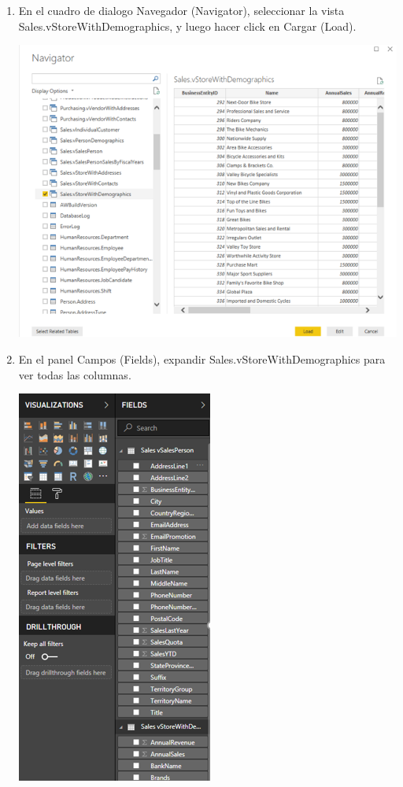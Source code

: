 \begin{itemize}
\begin{enumerate}
\item En el cuadro de dialogo Navegador (Navigator), seleccionar la vista Sales.vStoreWithDemographics, y luego hacer click en Cargar (Load).

\begin{center}
\includegraphics[scale=0.55]{./Imagenes/a9.png}
\end{center}

\item En el panel Campos (Fields), expandir Sales.vStoreWithDemographics para ver todas las columnas.
\begin{center}
\includegraphics[scale=0.55]{./Imagenes/a10.png}
\end{center}


\end{enumerate}
\end{itemize}
